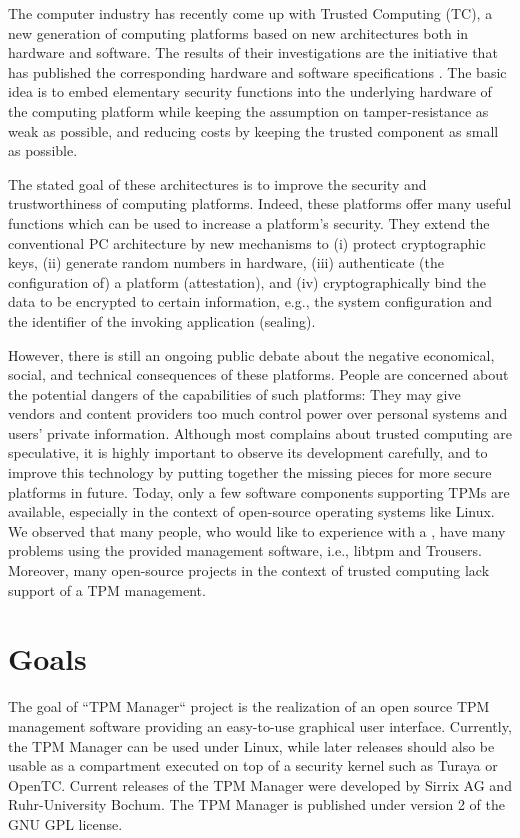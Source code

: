 \documentclass[
  american        %
]{sirrixreport}
\begin{document}
The computer industry has recently come up with Trusted Computing (TC), a new generation of computing platforms based on new architectures both in hardware and software. The results of their investigations are the \TCG initiative that has published the corresponding hardware and software specifications \cite{TPM_1.2.103}.
The basic idea is to embed elementary security functions into the underlying hardware of the computing platform while keeping the assumption on tamper-resistance as weak as possible, and reducing costs by keeping the trusted component as small as possible.

The stated goal of these architectures is to improve the security and trustworthiness of computing platforms. Indeed, these platforms offer many useful functions which can be used to increase a platform's security. They extend the conventional PC architecture by new mechanisms to (i) protect cryptographic keys, (ii) generate random numbers in hardware, (iii) authenticate (the configuration of) a platform (attestation), and (iv) cryptographically bind the data to be encrypted to certain information, e.g., the system configuration and the identifier of the invoking application (sealing). 

However, there is still an ongoing public debate about the negative economical, social, and technical consequences of these platforms. People are concerned about the potential dangers of the capabilities of such platforms: They may give vendors and content providers too much control power over personal systems and users' private information. Although most complains about trusted computing are speculative, it is highly important to observe its development carefully, and to improve this technology by putting together the missing pieces for more secure platforms in future. 
Today, only a few software components supporting TPMs are available, especially in the context of open-source operating systems like Linux. We observed that many people, who would like to experience with a \TPM, have many problems using the provided management software, i.e., libtpm and Trousers. Moreover, many open-source projects in the context of trusted computing lack support of a TPM management.

\section{Goals}
The goal of ``TPM Manager`` project is the realization of an open source TPM management software providing an easy-to-use graphical user interface. Currently, the TPM Manager can be used under Linux, while later releases should also be usable as a compartment executed on top of a security kernel such as Turaya or OpenTC. Current releases of the TPM Manager were developed by Sirrix AG and Ruhr-University Bochum. The TPM Manager is published under version 2 of the GNU GPL license.
\end{document}
